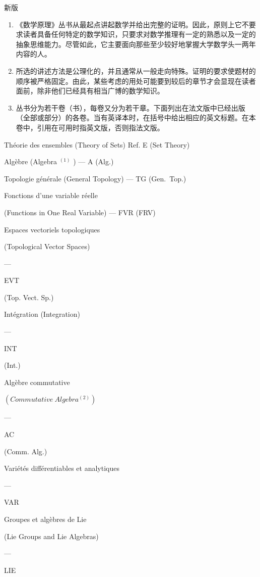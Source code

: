 
新版

\begin{enumerate}
\def\labelenumi{\arabic{enumi}.}
\item
  《数学原理》丛书从最起点讲起数学并给出完整的证明。因此，原则上它不要求读者具备任何特定的数学知识，只要求对数学推理有一定的熟悉以及一定的抽象思维能力。尽管如此，它主要面向那些至少较好地掌握大学数学头一两年内容的人。
\item
  所选的讲述方法是公理化的，并且通常从一般走向特殊。证明的要求使题材的顺序被严格固定。由此，某些考虑的用处可能要到较后的章节才会显现在读者面前，除非他们已经具有相当广博的数学知识。
\item
  丛书分为若干卷（书），每卷又分为若干章。下面列出在法文版中已经出版（全部或部分）的各卷。当有英译本时，在括号中给出相应的英文标题。在本卷中，引用在可用时指英文版，否则指法文版。
\end{enumerate}

Théorie des ensembles (Theory of Sets) Ref. E (Set Theory)

Algèbre (Algebra \(^{(1)}\) ) --- A (Alg.)

Topologie générale (General Topology) --- TG (Gen.~Top.)

Fonctions d'une variable réelle

(Functions in One Real Variable) --- FVR (FRV)

Espaces vectoriels topologiques

(Topological Vector Spaces)

---

EVT

(Top. Vect. Sp.)

Intégration (Integration)

---

INT

(Int.)

Algèbre commutative

\((Commutative\ Algebra^{(2)})\)

---

AC

(Comm. Alg.)

Variétés différentiables et analytiques

---

VAR

Groupes et algèbres de Lie

(Lie Groups and Lie Algebras)

---

LIE

